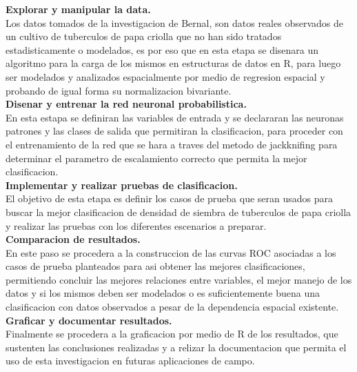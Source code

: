 \noindent
\textbf{Explorar y manipular la data.}\\

Los datos tomados de la investigacion de Bernal, son datos reales observados de un cultivo de tuberculos de papa criolla que no han sido tratados estadisticamente o modelados, es por eso que en esta etapa se disenara un algoritmo para la carga de los mismos en estructuras de datos en R, para luego ser modelados y analizados espacialmente por medio de regresion espacial y probando de igual forma su normalizacion bivariante.\\

\noindent
\textbf{Disenar y entrenar la red neuronal probabilistica.}\\

En esta estapa se definiran las variables de entrada y se declararan las neuronas patrones y las clases de salida que permitiran la clasificacion, para proceder con el entrenamiento de la red que se hara a traves del metodo de jackknifing para determinar el parametro de escalamiento correcto que permita la mejor clasificacion.\\

\noindent
\textbf{Implementar y realizar pruebas de clasificacion.}\\

El objetivo de esta etapa es definir los casos de prueba que seran usados para buscar la mejor clasificacion de densidad de siembra de tuberculos de papa criolla y realizar las pruebas con los diferentes escenarios a preparar.\\

\noindent
\textbf{Comparacion de resultados.}\\

En este paso se procedera a la construccion de las curvas ROC asociadas a los casos de prueba planteados para asi obtener las mejores clasificaciones, permitiendo concluir las mejores relaciones entre variables, el mejor manejo de los datos y si los mismos deben ser modelados o es suficientemente buena una clasificacion con datos observados a pesar de la dependencia espacial existente.\\

\noindent
\textbf{Graficar y documentar resultados.}\\

Finalmente se procedera a la graficacion por medio de R de los resultados, que sustenten las conclusiones realizadas y a relizar la documentacion que permita el uso de esta investigacion en futuras aplicaciones de campo.\\  

